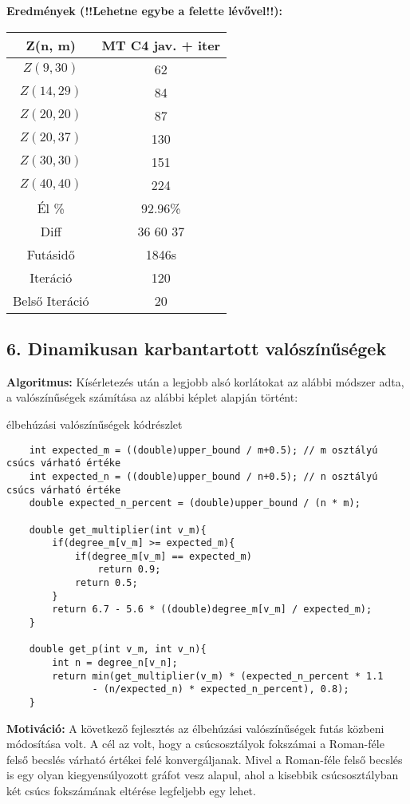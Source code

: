 \documentclass[12pt,a4paper]{article}
\begin{document}
\textbf{Eredmények (!!Lehetne egybe a felette lévővel!!):}
\begin{table}[H]
\centering
\begin{tabular}{|c|c|}
\hline
\textbf{Z(n, m)} & \textbf{MT C4 jav. + iter} \\
\hline
$Z(9,30)$  & 62 \\
$Z(14, 29)$ & 84 \\
$Z(20, 20)$ & 87 \\
$Z(20, 37)$ & 130 \\
$Z(30, 30)$ & 151 \\
$Z(40, 40)$ & 224 \\
\hline
Él \% & 92.96\% \\
\hline
Diff & 36 60 37 \\
\hline
Futásidő & 1846s \\
Iteráció & 120 \\
Belső Iteráció & 20 \\
\hline
\end{tabular}
\end{table}

\subsection*{6. Dinamikusan karbantartott valószínűségek}
\textbf{Algoritmus:} Kísérletezés után a legjobb alsó korlátokat az alábbi módszer adta, a valószínűségek számítása az alábbi
képlet alapján történt:
\begin{algorithm}[H]
\caption{élbehúzási valószínűségek kódrészlet}
\begin{verbatim} 
    int expected_m = ((double)upper_bound / m+0.5); // m osztályú csúcs várható értéke
    int expected_n = ((double)upper_bound / n+0.5); // n osztályú csúcs várható értéke
    double expected_n_percent = (double)upper_bound / (n * m);
    
    double get_multiplier(int v_m){
        if(degree_m[v_m] >= expected_m){
            if(degree_m[v_m] == expected_m)
                return 0.9;
            return 0.5;
        }
        return 6.7 - 5.6 * ((double)degree_m[v_m] / expected_m);
    }

    double get_p(int v_m, int v_n){
        int n = degree_n[v_n];
        return min(get_multiplier(v_m) * (expected_n_percent * 1.1
               - (n/expected_n) * expected_n_percent), 0.8);
    }
\end{verbatim}    
\end{algorithm}
\textbf{Motiváció:} A következő fejlesztés az élbehúzási valószínűségek futás közbeni módosítása volt. A cél az volt, hogy a csúcsosztályok fokszámai a Roman-féle felső becslés várható értékei felé konvergáljanak. Mivel a Roman-féle felső becslés is egy olyan kiegyensúlyozott gráfot vesz alapul, ahol a kisebbik csúcsosztályban két csúcs fokszámának eltérése legfeljebb egy lehet.
\end{document}
